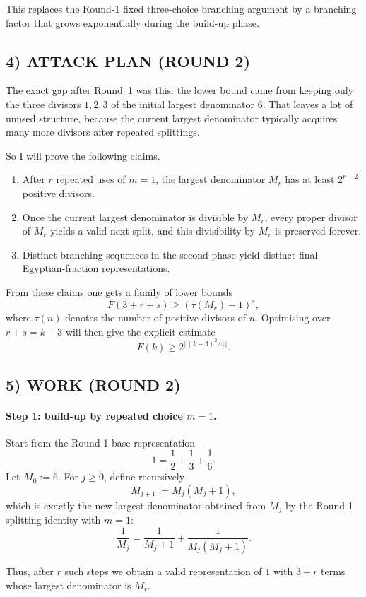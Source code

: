 This replaces the Round-1 fixed three-choice branching argument by a branching factor that grows exponentially during the build-up phase.

\subsection*{4) ATTACK PLAN (ROUND 2)}
The exact gap after Round~1 was this: the lower bound came from keeping only the three divisors $1,2,3$ of the initial largest denominator $6$. That leaves a lot of unused structure, because the current largest denominator typically acquires many more divisors after repeated splittings.

So I will prove the following claims.

\begin{enumerate}
\item After $r$ repeated uses of $m=1$, the largest denominator $M_r$ has at least $2^{r+2}$ positive divisors.
\item Once the current largest denominator is divisible by $M_r$, every proper divisor of $M_r$ yields a valid next split, and this divisibility by $M_r$ is preserved forever.
\item Distinct branching sequences in the second phase yield distinct final Egyptian-fraction representations.
\end{enumerate}

From these claims one gets a family of lower bounds
\[
F(3+r+s)\ge (\tau(M_r)-1)^s,
\]
where $\tau(n)$ denotes the number of positive divisors of $n$. Optimising over $r+s=k-3$ will then give the explicit estimate
\[
F(k)\ge 2^{\lfloor (k-3)^2/4\rfloor}.
\]

\subsection*{5) WORK (ROUND 2)}

\paragraph{Step 1: build-up by repeated choice $m=1$.}
Start from the Round-1 base representation
\[
1=\frac12+\frac13+\frac16.
\]
Let $M_0:=6$. For $j\ge 0$, define recursively
\[
M_{j+1}:=M_j(M_j+1),
\]
which is exactly the new largest denominator obtained from $M_j$ by the Round-1 splitting identity with $m=1$:
\[
\frac1{M_j}=\frac1{M_j+1}+\frac1{M_j(M_j+1)}.
\]

Thus, after $r$ such steps we obtain a valid representation of $1$ with $3+r$ terms whose largest denominator is $M_r$.

